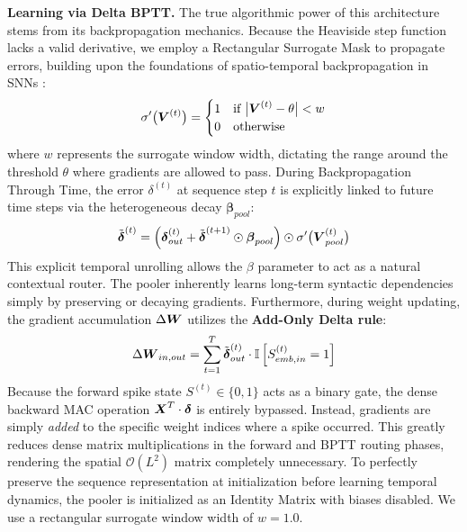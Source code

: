 \documentclass[10pt,a4paper,twoside]{article}
\begin{document}
\textbf{Learning via Delta BPTT.} The true algorithmic power of this architecture stems from its backpropagation mechanics. Because the Heaviside step function lacks a valid derivative, we employ a Rectangular Surrogate Mask to propagate errors, building upon the foundations of spatio-temporal backpropagation in SNNs \cite{neftci2019surrogate}:
\begin{equation}
\sigma'\big(\boldsymbol{V}^{(t)}\big) = \begin{cases} 1 & \text{if } \big|\boldsymbol{V}^{(t)} - \theta\big| < w \\ 0 & \text{otherwise} \end{cases}
\end{equation}
where $w$ represents the surrogate window width, dictating the range around the threshold $\theta$ where gradients are allowed to pass. During Backpropagation Through Time, the error $\delta^{(t)}$ at sequence step $t$ is explicitly linked to future time steps via the heterogeneous decay $\bm{\beta}_{pool}$:
\begin{equation}
\tilde{\boldsymbol{\delta}}^{(t)} = \left( \boldsymbol{\delta}_{out}^{(t)} + \tilde{\boldsymbol{\delta}}^{(t+1)} \odot \boldsymbol{\beta}_{pool} \right) \odot \sigma'\big(\boldsymbol{V}_{pool}^{(t)}\big)
\end{equation}
This explicit temporal unrolling allows the $\beta$ parameter to act as a natural contextual router. The pooler inherently learns long-term syntactic dependencies simply by preserving or decaying gradients. Furthermore, during weight updating, the gradient accumulation $\Delta \boldsymbol{W}$ utilizes the \textbf{Add-Only Delta rule}:
\begin{equation}
\Delta \boldsymbol{W}_{in, out} = \sum_{t=1}^{T} \tilde{\boldsymbol{\delta}}^{(t)}_{out} \cdot \mathbb{I}\left[ S_{emb, in}^{(t)} = 1 \right]
\end{equation}
Because the forward spike state $S^{(t)} \in \{0, 1\}$ acts as a binary gate, the dense backward MAC operation $\boldsymbol{X}^T \cdot \boldsymbol{\delta}$ is entirely bypassed. Instead, gradients are simply \textit{added} to the specific weight indices where a spike occurred. This greatly reduces dense matrix multiplications in the forward and BPTT routing phases, rendering the spatial $\mathcal{O}(L^2)$ matrix completely unnecessary. To perfectly preserve the sequence representation at initialization before learning temporal dynamics, the pooler is initialized as an Identity Matrix with biases disabled. We use a rectangular surrogate window width of $w=1.0$.
\end{document}
